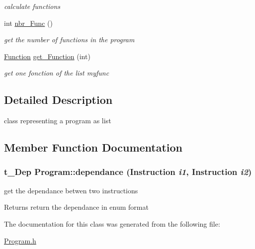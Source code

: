 \begin{DoxyCompactItemize}
\begin{DoxyCompactList}\small\item\em calculate functions \item\end{DoxyCompactList}\item 
\hypertarget{classProgram_a49de951941bbf46ca09075109d4d71f0}{
int \hyperlink{classProgram_a49de951941bbf46ca09075109d4d71f0}{nbr\_\-Func} ()}
\label{classProgram_a49de951941bbf46ca09075109d4d71f0}

\begin{DoxyCompactList}\small\item\em get the number of functions in the program \item\end{DoxyCompactList}\item 
\hypertarget{classProgram_a7af654f80023baa51c94604a176355b0}{
\hyperlink{classFunction}{Function} \hyperlink{classProgram_a7af654f80023baa51c94604a176355b0}{get\_\-Function} (int)}
\label{classProgram_a7af654f80023baa51c94604a176355b0}

\begin{DoxyCompactList}\small\item\em get one fonction of the list myfunc \item\end{DoxyCompactList}\end{DoxyCompactItemize}


\subsection{Detailed Description}
class representing a program as list 

\subsection{Member Function Documentation}
\hypertarget{classProgram_a9626cf3dd2cd7851fb28d84fd6632f52}{
\subsubsection[{dependance}]{\setlength{\rightskip}{0pt plus 5cm}t\_\-Dep Program::dependance ({\bf Instruction} {\em i1}, \/  {\bf Instruction} {\em i2})}}
\label{classProgram_a9626cf3dd2cd7851fb28d84fd6632f52}


get the dependance betwen two instructions \begin{DoxyReturn}{Returns}
return the dependance in enum format 
\end{DoxyReturn}


The documentation for this class was generated from the following file:\begin{DoxyCompactItemize}
\item 
\hyperlink{Program_8h}{Program.h}\end{DoxyCompactItemize}
